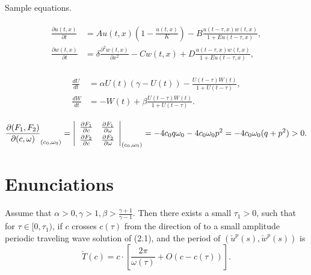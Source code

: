 \documentclass[times]{oupau}
\begin{document}
Sample equations.

\begin{align}\label{1.1}
\begin{split}
\frac{\partial u(t,x)}{\partial t} &= Au(t,x) \left(1-\frac{u(t,x)}{K}\right)-B\frac{u(t-\tau,x) w(t,x)}{1+Eu(t-\tau,x)},\\
\frac{\partial w(t,x)}{\partial t} &=\delta \frac{\partial^2w(t,x)}{\partial x^2}-Cw(t,x)+D\frac{u(t-\tau,x)w(t,x)}{1+Eu(t-\tau,x)},
\end{split}
\end{align}

\begin{align}\label{1.2}
\begin{split}
\frac{dU}{dt} &=\alpha U(t)(\gamma -U(t))-\frac{U(t-\tau)W(t)}{1+U(t-\tau)},\\
\frac{dW}{dt} &=-W(t)+\beta\frac{U(t-\tau)W(t)}{1+U(t-\tau)}.
\end{split}
\end{align}

\[
\frac{\partial(F_1,F_2)}{\partial(c,\omega)}_{(c_0,\omega_0)} = \left|
\begin{array}{ll}
\frac{\partial F_1}{\partial c} &\frac{\partial F_1}{\partial \omega} \\\noalign{\vskip3pt}
\frac{\partial F_2}{\partial c}&\frac{\partial F_2}{\partial \omega}
\end{array}\right|_{(c_0,\omega_0)}=-4c_0q\omega_0 -4c_0\omega_0p^2 =-4c_0\omega_0(q+p^2)>0.
\]

\section{Enunciations}




\begin{theorem}\label{T0.1}
Assume that $\alpha>0, \gamma>1, \beta>\frac{\gamma+1}{\gamma-1}$.
Then there exists a small $\tau_1>0$, such that for $\tau\in
[0,\tau_1)$, if $c$ crosses $c(\tau)$ from the direction of
to  a small amplitude periodic traveling wave solution of
(2.1), and the period of $(\check{u}^p(s),\check{w}^p(s))$ is
\[
\check{T}(c)=c\cdot \left[\frac{2\pi}{\omega(\tau)}+O(c-c(\tau))\right].
\]
\end{theorem}
\end{document}
